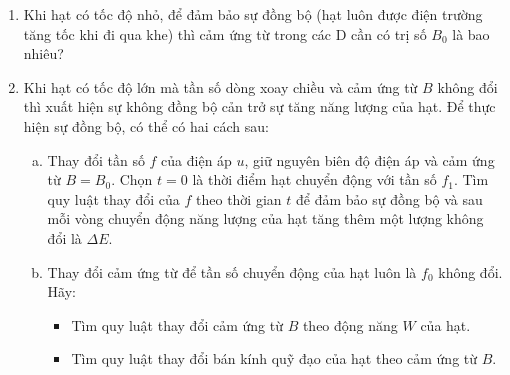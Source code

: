 \begin{vd}
\begin{center}
\begin{tikzpicture}[x=0.75pt,y=0.75pt,yscale=-1,xscale=1]
\end{tikzpicture}
\end{center}
\begin{enumerate}[1)]
    \item Khi hạt có tốc độ nhỏ, để đảm bảo sự đồng bộ (hạt luôn được điện trường tăng tốc khi đi qua khe) thì cảm ứng từ trong các D cần có trị số $B_0$ là bao nhiêu?     
    \item Khi hạt có tốc độ lớn mà tần số dòng xoay chiều và cảm ứng từ $B$ không đổi thì xuất hiện sự không đồng bộ cản trở sự tăng năng lượng của hạt. Để thực hiện sự đồng bộ, có thể có hai cách sau:
    \begin{enumerate}[a)]
        \item Thay đổi tần số $f$ của điện áp $u$, giữ nguyên biên độ điện áp và cảm ứng từ $B = B_0$. Chọn $t = 0$ là thời điểm hạt chuyển động với tần số $f_1$. Tìm quy luật thay đổi của $f$ theo thời gian $t$ để đảm bảo sự đồng bộ và sau mỗi vòng chuyển động năng lượng của hạt tăng thêm một lượng không đổi là $\Delta E$.       
        \item Thay đổi cảm ứng từ để tần số chuyển động của hạt luôn là $f_0$ không đổi. Hãy:
        \begin{itemize}
            \item Tìm quy luật thay đổi cảm ứng từ $B$ theo động năng $W$ của hạt.
            \item Tìm quy luật thay đổi bán kính quỹ đạo của hạt theo cảm ứng từ $B$.
        \end{itemize}
    \end{enumerate}
\end{enumerate}
\end{vd}


